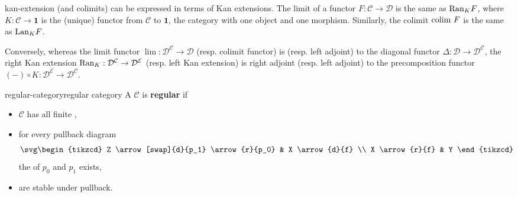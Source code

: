 \begin{example}{kan-extension}
     (and colimits) can be expressed in terms of Kan extensions. The limit of a functor $F : \mathcal{C} \to \mathcal{D}$ is the same as $\textup{Ran}_K F$, where $K : \mathcal{C} \to \textbf{1}$ is the (unique) functor from $\mathcal{C}$ to $\textbf{1}$, the category with one object and one morphism. Similarly, the colimit $\textup{colim } F$ is the same as $\textup{Lan}_K F$.
    
    Conversely, whereas the limit functor $\lim : \mathcal{D}^\mathcal{C} \to \mathcal{D}$ (resp. colimit functor) is  (resp. left adjoint) to the diagonal functor $\Delta : \mathcal{D} \to \mathcal{D}^\mathcal{C}$, the right Kan extension $\textup{Ran}_K : \mathcal{D}^\mathcal{C} \to \mathcal{D}^\mathcal{E}$ (resp. left Kan extension) is right adjoint (resp. left adjoint) to the precomposition functor $(-) \circ K : \mathcal{D}^\mathcal{E} \to \mathcal{D}^\mathcal{C}$.
\end{example}

\begin{topic}{regular-category}{regular category}
    A  $\mathcal{C}$ is \textbf{regular} if
    \begin{itemize}
        \item $\mathcal{C}$ has all finite ,
        \item for every pullback diagram
        \[ \svg \begin{tikzcd} Z \arrow[swap]{d}{p_1} \arrow{r}{p_0} & X \arrow{d}{f} \\ X \arrow{r}{f} & Y \end{tikzcd} \]
        the  of $p_0$ and $p_1$ exists,
        \item {} are stable under pullback.
    \end{itemize}
\end{topic}

